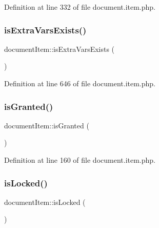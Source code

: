 Definition at line 332 of file document.\+item.\+php.

\mbox{\label{classdocumentItem_ac51058096d79221c90595564e3dbdb82}} 
\subsubsection{\texorpdfstring{is\+Extra\+Vars\+Exists()}{isExtraVarsExists()}}
{\footnotesize\ttfamily document\+Item\+::is\+Extra\+Vars\+Exists (\begin{DoxyParamCaption}{ }\end{DoxyParamCaption})}



Definition at line 646 of file document.\+item.\+php.

\mbox{\label{classdocumentItem_a571c72e54e18c33bb93303489edda406}} 
\subsubsection{\texorpdfstring{is\+Granted()}{isGranted()}}
{\footnotesize\ttfamily document\+Item\+::is\+Granted (\begin{DoxyParamCaption}{ }\end{DoxyParamCaption})}



Definition at line 160 of file document.\+item.\+php.

\mbox{\label{classdocumentItem_ad99f7615ed11289ce2976096d36d5185}} 
\subsubsection{\texorpdfstring{is\+Locked()}{isLocked()}}
{\footnotesize\ttfamily document\+Item\+::is\+Locked (\begin{DoxyParamCaption}{ }\end{DoxyParamCaption})}




